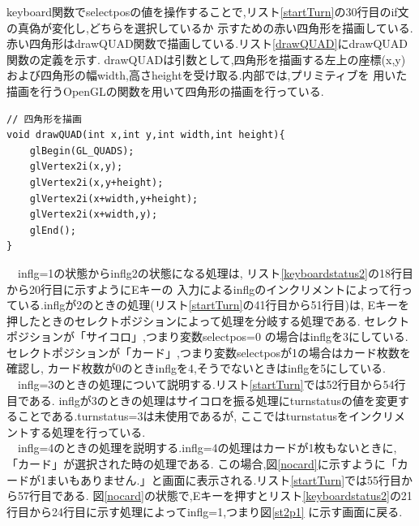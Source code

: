 \documentclass[a4j]{jarticle}
\begin{document}
        keyboard関数でselectposの値を操作することで,リスト\ref{startTurn}の30行目のif文の真偽が変化し,どちらを選択しているか
        示すための赤い四角形を描画している.赤い四角形はdrawQUAD関数で描画している.リスト\ref{drawQUAD}にdrawQUAD関数の定義を示す.
        drawQUADは引数として,四角形を描画する左上の座標(x,y)および四角形の幅width,高さheightを受け取る.内部では,プリミティブを
        用いた描画を行うOpenGLの関数を用いて四角形の描画を行っている.

        \begin{lstlisting}[basicstyle=\ttfamily\footnotesize, frame=single,label=drawQUAD,caption=drawQUAD関数]
// 四角形を描画
void drawQUAD(int x,int y,int width,int height){
    glBegin(GL_QUADS);
    glVertex2i(x,y);
    glVertex2i(x,y+height);
    glVertex2i(x+width,y+height);
    glVertex2i(x+width,y);
    glEnd();       
}
        \end{lstlisting}   
        　inflg=1の状態からinflg2の状態になる処理は, リスト\ref{keyboardstatus2}の18行目から20行目に示すようにEキーの
        入力によるinflgのインクリメントによって行っている.inflgが2のときの処理(リスト\ref{startTurn}の41行目から51行目)は,
        Eキーを押したときのセレクトポジションによって処理を分岐する処理である. セレクトポジションが「サイコロ」,つまり変数selectpos=0
        の場合はinflgを3にしている. セレクトポジションが「カード」,つまり変数selectposが1の場合はカード枚数を確認し,
        カード枚数が0のときinflgを4,そうでないときはinflgを5にしている.\\
        　inflg=3のときの処理について説明する.リスト\ref{startTurn}では52行目から54行目である.
        inflgが3のときの処理はサイコロを振る処理にturnstatusの値を変更することである.turnstatus=3は未使用であるが,
        ここではturnstatusをインクリメントする処理を行っている.\\
        　inflg=4のときの処理を説明する.inflg=4の処理はカードが1枚もないときに,「カード」が選択された時の処理である.
        この場合,図\ref{nocard}に示すように「カードが1まいもありません.」と画面に表示される.リスト\ref{startTurn}では55行目から57行目である. 
        図\ref{nocard}の状態で,Eキーを押すとリスト\ref{keyboardstatus2}の21行目から24行目に示す処理によってinflg=1,つまり図\ref{st2p1}
        に示す画面に戻る.
\end{document}
